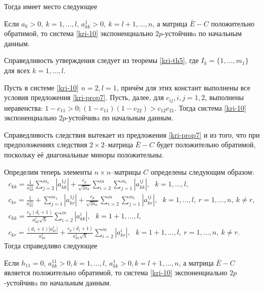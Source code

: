 Тогда имеет место следующее

\begin{proposition}\label{kri-prop7} Если $a_k
> 0, \ k = 1,...,l$, $a^1_{kk} > 0, \ k = l +1,...,n$, а
матрица $\bar E - C$ положительно обратимой, то система \eqref{kri-10}
экспоненциально $2p$-устойчивa по начальным данным.
\end{proposition}

Справедливость утверждения следует из теоремы \ref{kri-th5}, где $I_k = \{1,
..., m_1\}$ для всех $k = 1, ..., l$.

\begin{corollary}\label{kri-cor1}  Пусть в системе \eqref{kri-10} $n = 2, l = 1$,
причём для этих констант выполнены все условия предложения \ref{kri-prop7}. Пусть,
далее, для $c_{ij}, i,j = 1, 2$, выполнены неравенства: $ 1 - c_{11}
> 0; (1 - c_{11})(1 - c_{22}) > c_{12}c_{21}$. Тогда система \eqref{kri-10}
экспоненциально $2p$-устойчивa по начальным данным.
\end{corollary}

Справедливость следствия вытекает из предложения \ref{kri-prop7} и из того, что при
предположениях следствия $2\times 2$--матрица $\bar E - C$ будет
положительно обратимой, поскольку её диагональные миноры
положительны.

Определим теперь элементы  $n\times n$--матрицы $C$ определены
следующим образом:
$$
\begin{array}{crl}
c_{kk}  = \frac{1}{a^{11}_{kk}}\sum \limits_{j =2}^{m_1}
|a^{1j}_{kk}| + \frac{c_p}{\sqrt{2a_k }}\sum
\limits_{i=2}^m \sum \limits_{j=1}^{m_i}|a^{ij}_{kk}|, \ \ \ k = 1,...,l,\\
c_{kr} = \frac{1}{a _{kk}^{11}} + \sum \limits_{j=1}^{m_1}
|a^{1j}_{kr}|+ \frac{c_p}{\sqrt{2a_k }}\sum \limits_{i=2}^m \sum
\limits_{j=1}^{m_i} |a^{ij}_{kr}|, \ \ \ k =
1,...,l, \ r = 1, ..., n, \ k \neq r,\\
 c_{kk} = \frac{c_p(d_i+1)}{a^1_{kk}\sqrt{h}}
\sum\limits _{i=2}^{m}|a^{i}_{kk}|, \ \ \ k = 1 + 1,...,l, \\
c_{kr} = \frac{(d_1 + 1)|a^{1}_{kr}|}{a^1_{kk}}
+\frac{c_p(d_i+1)}{a^1_{kk}\sqrt{h}} \sum\limits
_{i=2}^{m}|a^{i}_{kr}|, \ \ \ k = 1 + 1,...,l, \ r = 1, ...,n, \ k
\neq r.
\end {array}
$$
Тогда справедливо следующее

\begin{proposition}\label{kri-prop8}
 Если $h_{11} =0$, $ a^{11}_{kk}
> 0, k = 1,...,l$, $a^1_{kk} > 0, k = l + 1,...,n$, а матрица $\bar E - C$ является
положительно обратимой, то система \eqref{kri-10} экспоненциально
$2p$-устойчивa по начальным данным.
\end{proposition}

